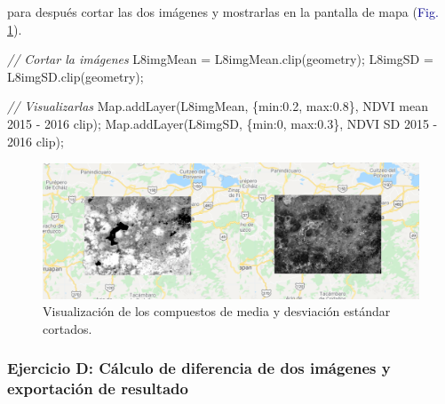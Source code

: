 \documentclass[
  12pt,
  letterpaper,
  twoside]{book}
\newenvironment{Shaded}{\begin{snugshade}}{\end{snugshade}}
\newcommand{\CommentTok}[1]{\textcolor[rgb]{0.24,0.58,0.00}{\textit{#1}}}
\newcommand{\DataTypeTok}[1]{\textcolor[rgb]{0.00,0.00,0.00}{#1}}
\newcommand{\DecValTok}[1]{\textcolor[rgb]{0.28,0.53,0.93}{#1}}
\newcommand{\FloatTok}[1]{\textcolor[rgb]{0.28,0.53,0.93}{#1}}
\newcommand{\FunctionTok}[1]{\textcolor[rgb]{0.48,0.12,0.64}{#1}}
\newcommand{\KeywordTok}[1]{\textcolor[rgb]{0.48,0.12,0.64}{#1}}
\newcommand{\NormalTok}[1]{#1}
\newcommand{\OperatorTok}[1]{\textcolor[rgb]{0.00,0.00,0.00}{#1}}
\newcommand{\StringTok}[1]{\textcolor[rgb]{0.87,0.29,0.22}{#1}}
\begin{document}
para después cortar las dos imágenes y mostrarlas en la pantalla de mapa (\textcolor{darkblue}{Fig.} \ref{fig:f1022}).

\begin{Shaded}
\begin{Highlighting}[]
\CommentTok{// Cortar la imágenes}
\NormalTok{L8imgMean }\OperatorTok{=}\NormalTok{ L8imgMean}\OperatorTok{.}\FunctionTok{clip}\NormalTok{(geometry)}\OperatorTok{;}
\NormalTok{L8imgSD }\OperatorTok{=}\NormalTok{ L8imgSD}\OperatorTok{.}\FunctionTok{clip}\NormalTok{(geometry)}\OperatorTok{;}

\CommentTok{// Visualizarlas}
\KeywordTok{Map}\OperatorTok{.}\FunctionTok{addLayer}\NormalTok{(L8imgMean}\OperatorTok{,}\NormalTok{ \{}\DataTypeTok{min}\OperatorTok{:}\FloatTok{0.2}\OperatorTok{,} \DataTypeTok{max}\OperatorTok{:}\FloatTok{0.8}\NormalTok{\}}\OperatorTok{,} \StringTok{\textquotesingle{}NDVI mean 2015 {-} 2016 clip\textquotesingle{}}\NormalTok{)}\OperatorTok{;}
\KeywordTok{Map}\OperatorTok{.}\FunctionTok{addLayer}\NormalTok{(L8imgSD}\OperatorTok{,}\NormalTok{ \{}\DataTypeTok{min}\OperatorTok{:}\DecValTok{0}\OperatorTok{,} \DataTypeTok{max}\OperatorTok{:}\FloatTok{0.3}\NormalTok{\}}\OperatorTok{,} \StringTok{\textquotesingle{}NDVI SD 2015 {-} 2016 clip\textquotesingle{}}\NormalTok{)}\OperatorTok{;}
\end{Highlighting}
\end{Shaded}

\begin{figure}[H]

{\centering \includegraphics[width=0.95\linewidth]{Img/meansdclip} 

}

\caption{Visualización de los compuestos de media y desviación estándar cortados.}\label{fig:f1022}
\end{figure}

\hypertarget{ejercicio-d-cuxe1lculo-de-diferencia-de-dos-imuxe1genes-y-exportaciuxf3n-de-resultado}{%
\subsubsection*{Ejercicio D: Cálculo de diferencia de dos imágenes y exportación de resultado}\label{ejercicio-d-cuxe1lculo-de-diferencia-de-dos-imuxe1genes-y-exportaciuxf3n-de-resultado}}
\end{document}
